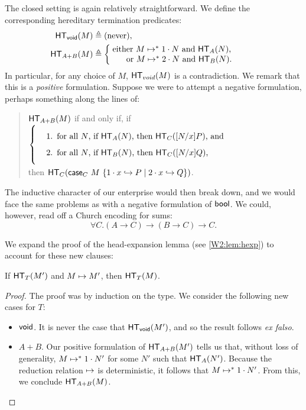 \documentclass{article}
\begin{document}
The closed setting is again relatively straightforward.
We define the corresponding hereditary termination predicates:
\begin{align*}
  \hterm{\void}{M} &\triangleq \text{(never)},\\
  \hterm{A+B}{M} &\triangleq \left\{\;\parbox{0.5\linewidth}{%
                   either $\steps{M}{\inl N}$ and $\hterm{A}{N}$,\\%
  \phantom{eith}or $\steps{M}{\inr N}$ and $\hterm{B}{N}$.}\right.
\end{align*}
In particular, for any choice of $M$, $\mathsf{HT}_{void}(M)$ is a contradiction.
We remark that this is a \textit{positive} formulation.
Suppose we were to attempt a negative formulation, perhaps something along the lines of:
\begin{quote}
  $\mathsf{HT}_{A+B}(M)$ if and only if,
  if $\left\{\parbox{\linewidth}{\begin{enumerate}
      \item for all $N$, if $\hterm{A}{N}$, then $\hterm{C}{\subst{N}{x}{P}}$, and
      \item for all $N$, if $\hterm{B}{N}$, then $\hterm{C}{\subst{N}{x}{Q}}$,
  \end{enumerate}}\right.$
  then $\mathsf{HT}_{C}(\mathsf{case}_{C}\ M\ \{1\cdot x \hookrightarrow P \mid 2\cdot x \hookrightarrow Q\})$.
\end{quote}
The inductive character of our enterprise would then break down, and we would face the same problems as with a negative formulation of $\mathsf{bool}$.
We could, however, read off a Church encoding for sums:
\[
  \forall C. (A \to C) \to (B \to C) \to C.
\]

We expand the proof of the head-expansion lemma (see \cref{W2:lem:hexp}) to account for these new clauses:

\begin{lemma}
  \label{lemma:closed-hexp-sums}
  If $\mathsf{HT}_{T}(M')$ and $M \mapsto M'$, then $\mathsf{HT}_{T}(M)$.
\end{lemma}

\begin{proof}
  The proof was by induction on the type.
  We consider the following new cases for $T$:
  \begin{itemize}
  \item $\mathsf{void}$. It is never the case that $\mathsf{HT}_{\mathsf{void}}(M')$, and so the result follows \textit{ex falso}.
  \item $A + B$. Our positive formulation of $\mathsf{HT}_{A+B}(M')$ tells us that, without loss of generality, $M \mapsto^* 1\cdot N'$ for some $N'$ such that $\mathsf{HT}_{A}(N')$.
    Because the reduction relation $ \mapsto $ is deterministic, it follows that $M \mapsto^* 1\cdot N'$.
    From this, we conclude $\mathsf{HT}_{A+B}(M)$.\qedhere
  \end{itemize}
\end{proof}
\end{document}

